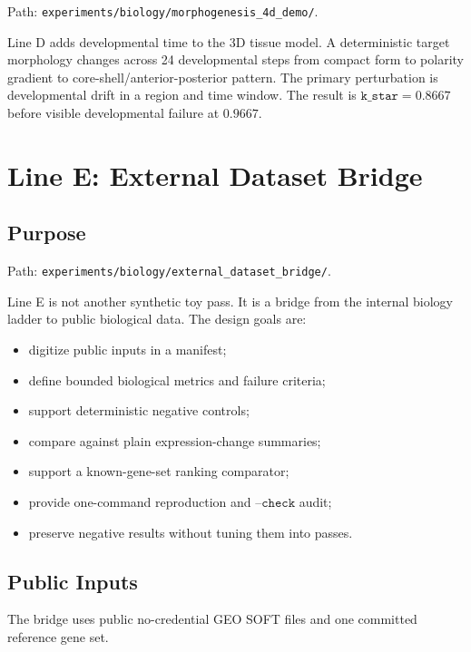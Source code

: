 \documentclass[11pt]{article}
\begin{document}
Path: \texttt{experiments/biology/morphogenesis\_4d\_demo/}.

Line D adds developmental time to the 3D tissue model. A deterministic target morphology changes across 24 developmental steps from compact form to polarity gradient to core-shell/anterior-posterior pattern. The primary perturbation is developmental drift in a region and time window. The result is \(\texttt{k\_star}=0.8667\) before visible developmental failure at \(0.9667\).

\section{Line E: External Dataset Bridge}

\subsection{Purpose}

Path: \texttt{experiments/biology/external\_dataset\_bridge/}.

Line E is not another synthetic toy pass. It is a bridge from the internal biology ladder to public biological data. The design goals are:

\begin{itemize}
\item digitize public inputs in a manifest;
\item define bounded biological metrics and failure criteria;
\item support deterministic negative controls;
\item compare against plain expression-change summaries;
\item support a known-gene-set ranking comparator;
\item provide one-command reproduction and \(\texttt{--check}\) audit;
\item preserve negative results without tuning them into passes.
\end{itemize}

\subsection{Public Inputs}

The bridge uses public no-credential GEO SOFT files and one committed reference gene set.
\end{document}

